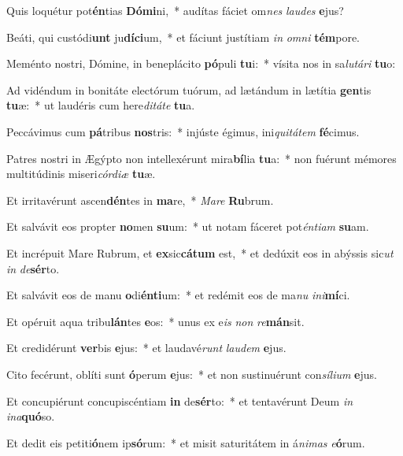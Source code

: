 \item Quis loquétur pot\textbf{én}tias \textbf{Dó}\textbf{mi}ni,~* audítas fáciet om\textit{nes} \textit{lau}\textit{des} \textbf{e}jus?
\item Beáti, qui custódi\textbf{unt} ju\textbf{dí}\textbf{ci}um,~* et fáciunt justítiam \textit{in} \textit{om}\textit{ni} \textbf{tém}pore.
\item Meménto nostri, Dómine, in beneplácito \textbf{pó}puli \textbf{tu}i:~* vísita nos in sa\textit{lu}\textit{tá}\textit{ri} \textbf{tu}o:
\item Ad vidéndum in bonitáte electórum tuórum, ad lætándum in lætítia \textbf{gen}tis \textbf{tu}æ:~* ut laudéris cum here\textit{di}\textit{tá}\textit{te} \textbf{tu}a.
\item Peccávimus cum \textbf{pá}tribus \textbf{nos}tris:~* injúste égimus, ini\textit{qui}\textit{tá}\textit{tem} \textbf{fé}cimus.
\item Patres nostri in Ægýpto non intellexérunt mira\textbf{bí}lia \textbf{tu}a:~* non fuérunt mémores multitúdinis miseri\textit{cór}\textit{di}\textit{æ} \textbf{tu}æ.
\item Et irritavérunt ascen\textbf{dén}tes in \textbf{ma}re,~* \textit{Ma}\textit{re} \textbf{Ru}brum.
\item Et salvávit eos propter \textbf{no}men \textbf{su}um:~* ut notam fáceret pot\textit{én}\textit{ti}\textit{am} \textbf{su}am.
\item Et incrépuit Mare Rubrum, et \textbf{ex}sic\textbf{cá}\textbf{tum} est,~* et dedúxit eos in abýssis sic\textit{ut} \textit{in} \textit{de}\textbf{sér}to.
\item Et salvávit eos de manu \textbf{o}di\textbf{én}\textbf{ti}um:~* et redémit eos de ma\textit{nu} \textit{in}\textit{i}\textbf{mí}ci.
\item Et opéruit aqua tribu\textbf{lán}tes \textbf{e}os:~* unus ex e\textit{is} \textit{non} \textit{re}\textbf{mán}sit.
\item Et credidérunt \textbf{ver}bis \textbf{e}jus:~* et laudavé\textit{runt} \textit{lau}\textit{dem} \textbf{e}jus.
\item Cito fecérunt, oblíti sunt \textbf{ó}perum \textbf{e}jus:~* et non sustinuérunt con\textit{sí}\textit{li}\textit{um} \textbf{e}jus.
\item Et concupiérunt concupiscéntiam \textbf{in} de\textbf{sér}to:~* et tentavérunt Deum \textit{in} \textit{in}\textit{a}\textbf{quó}so.
\item Et dedit eis petiti\textbf{ó}nem ip\textbf{só}rum:~* et misit saturitátem in á\textit{ni}\textit{mas} \textit{e}\textbf{ó}rum.
